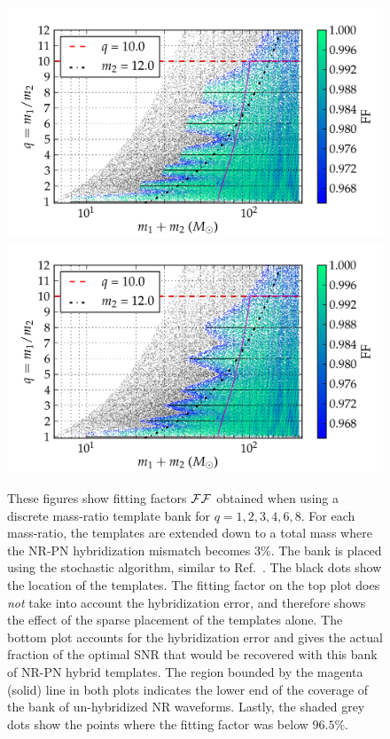 \begin{figure}
\begin{center}
\includegraphics[width=0.8\columnwidth]{figures/nrhybbank/bank001_lowM_01_stochastic_mtot200_logMq_NOhybMM-tiny.png}
\includegraphics[width=0.8\columnwidth]{figures/nrhybbank/bank001_lowM_01_stochastic_mtot200_logMq_hybMM-tiny.png}
\caption{\label{fig:Current-hybrids-stochastic-FF}These figures show fitting
  factors $\mathcal{FF}$ obtained when using a discrete mass-ratio template bank for
  $q=1,2,3,4,6,8$. For each mass-ratio, the templates are extended down 
  to a total mass where the NR-PN hybridization mismatch becomes
  $3\%$. The bank is placed using the stochastic algorithm, similar to 
  Ref.~\cite{Harry:2009ea,Ajith:2012mn,Manca:2009xw}. 
  The black dots show the location
  of the templates. The fitting factor on the top plot does 
  {\em not} take into account the hybridization error, and therefore shows the
  effect of the sparse placement of the templates alone. 
  The bottom plot accounts for the hybridization error
  and gives the actual fraction of the optimal SNR that would be recovered
  with this bank of NR-PN hybrid templates. The region bounded by the magenta 
  (solid) line in both plots indicates the lower end of the coverage of the 
  bank of un-hybridized NR waveforms. Lastly, the shaded grey dots show the 
  points where the fitting factor was below $96.5\%$.}
\end{center}
\end{figure}
